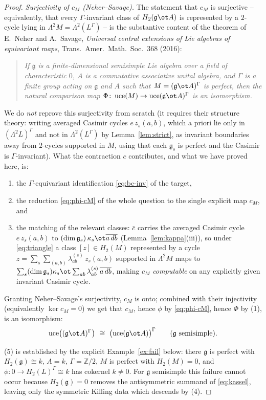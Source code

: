 \documentclass{amsart}
\theoremstyle{definition}
\DeclareMathOperator{\uce}{uce}
\newcommand{\g}{\mathfrak{g}}
\newcommand{\Gm}{\Gamma}
\newcommand{\ra}{\rightarrow}
\begin{document}
\begin{proof}
\emph{Surjectivity of $c_M$ (Neher--Savage).}  The statement that $c_M$ is
surjective -- equivalently, that every $\Gm$-invariant class of $H_2(\g\ot A)$ is
represented by a $2$-cycle lying in $\Lambda^2M=\Lambda^2(L^{\Gm})$ -- is the
substantive content of the theorem of E.~Neher and A.~Savage,
\emph{Universal central extensions of Lie algebras of equivariant maps},
Trans.\ Amer.\ Math.\ Soc.\ 368 (2016):
\begin{quote}
\emph{If $\g$ is a finite-dimensional semisimple Lie algebra over a field of
characteristic $0$, $A$ is a commutative associative unital algebra, and $\Gm$ is a
finite group acting on $\g$ and $A$ such that $M=(\g\ot A)^{\Gm}$ is perfect, then
the natural comparison map $\Phi\colon\uce(M)\ra\uce(\g\ot A)^{\Gm}$ is an
isomorphism.}
\end{quote}
We do \emph{not} reprove this surjectivity from scratch (it requires their
structure theory: writing averaged Casimir cycles $e\,z_s(a,b)$, which a priori lie
only in $(\Lambda^2L)^{\Gm}$ and not in $\Lambda^2(L^{\Gm})$ by
Lemma~\ref{lem:strict}, as invariant boundaries away from $2$-cycles supported in
$M$, using that each $\g_s$ is perfect and the Casimir is $\Gm$-invariant).  What
the contraction $c$ contributes, and what we have proved here, is:
\begin{enumerate}
\item[(4a)] the $\Gm$-equivariant identification \eqref{eq:bc-inv} of the target,
\item[(4b)] the reduction \eqref{eq:phi-cM} of the whole question to the single
explicit map $c_M$, and
\item[(4c)] the matching of the relevant classes: $\bar c$ carries the averaged
Casimir cycle $e\,z_s(a,b)$ to $(\dim\g_s)\,\kappa_s\ot\overline{a\,db}$
(Lemma~\ref{lem:kappa}(iii)), so under \eqref{eq:triangle} a class $[z]\in H_2(M)$
represented by a cycle $z=\sum_s\sum_{(a,b)}\lambda^{(s)}_{ab}\,z_s(a,b)$ supported
in $\Lambda^2M$ maps to
$\sum_s(\dim\g_s)\kappa_s\ot\sum_{ab}\lambda^{(s)}_{ab}\,\overline{a\,db}$,
making $c_M$ \emph{computable} on any explicitly given invariant Casimir cycle.
\end{enumerate}
Granting Neher--Savage's surjectivity, $c_M$ is onto; combined with their
injectivity (equivalently $\ker c_M=0$) we get that $c_M$, hence $\phi$ by
\eqref{eq:phi-cM}, hence $\Phi$ by (1), is an isomorphism:
\[
   \uce\bigl((\g\ot A)^{\Gm}\bigr)\ \cong\ \bigl(\uce(\g\ot A)\bigr)^{\Gm}
   \qquad(\g\ \text{semisimple}).
\]

\smallskip
(5) is established by the explicit Example~\ref{ex:fail} below: there $\g$ is
perfect with $H_2(\g)\cong k$, $A=k$, $\Gm=\mathbb Z/2$, $M$ is perfect with
$H_2(M)=0$, and $\phi\colon0\ra H_2(L)^{\Gm}\cong k$ has cokernel $k\ne0$.
For $\g$ semisimple this failure cannot occur because $H_2(\g)=0$ removes the
antisymmetric summand of \eqref{eq:kassel}, leaving only the symmetric Killing
data which descends by (4).
\end{proof}
\end{document}
